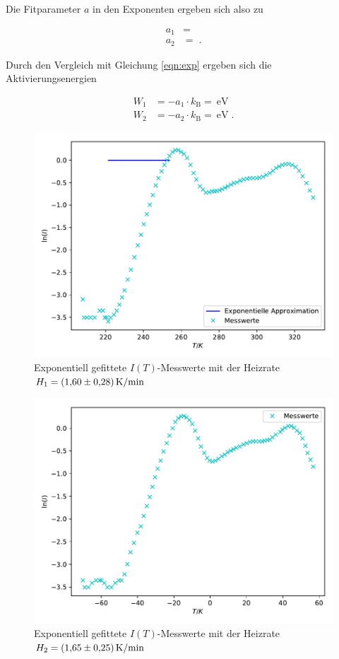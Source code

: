 Die Fitparameter $a$ in den Exponenten ergeben sich also zu

\begin{align*}
  a_1 &= \num{} \\
  a_2 &= \num{}  \; .
\end{align*}

Durch den Vergleich mit Gleichung \eqref{eqn:exp} ergeben sich die Aktivierungsenergien

\begin{align*}
  W_1 &= -a_1 \cdot k_\text{B} = \SI{}{\eV} \\
  W_2 &= -a_2 \cdot k_\text{B} = \SI{}{\eV}  \; .
\end{align*}


\begin{figure}
  \centering
  \includegraphics[scale=0.7]{content/plot1.pdf}
  \caption{Exponentiell gefittete $I(T)$-Messwerte mit der Heizrate $H_1 = \SI{1.60 +- 0.28}{\kelvin\per\minute}$}
  \label{fig:plot1}
\end{figure}

\begin{figure}
  \centering
  \includegraphics[scale=0.7]{content/plot2.pdf}
  \caption{Exponentiell gefittete $I(T)$-Messwerte mit der Heizrate $H_2 = \SI{1.65 +- 0.25}{\kelvin\per\minute}$}
  \label{fig:plot2}
\end{figure}


